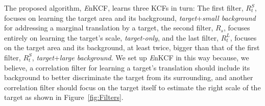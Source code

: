 \documentclass[10pt,twocolumn,letterpaper]{article}
\begin{document}
The proposed algorithm, {\it E}nKCF, learns three KCFs in turn: The
first filter, $R_{t}^{S}$, focuses on learning the target area and its
background, \textit{target}+\textit{small background} for addressing a
marginal translation by a target, the second filter, $R_{s}$, focuses
entirely on learning the target's scale, \textit{target-only}, and the
last filter, $R_{t}^{L}$, focuses on the target area and its
background, at least twice, bigger than that of the first filter,
$R_{t}^{S}$, \textit{target}+\textit{large background}. We set up {\it
  E}nKCF in this way because, we believe, a correlation filter for
learning a target's translation should include its background to
better discriminate the target from its surrounding, and another
correlation filter should focus on the target itself to estimate the
right scale of the target as shown in Figure~\ref{fig:Filters}.
\end{document}

